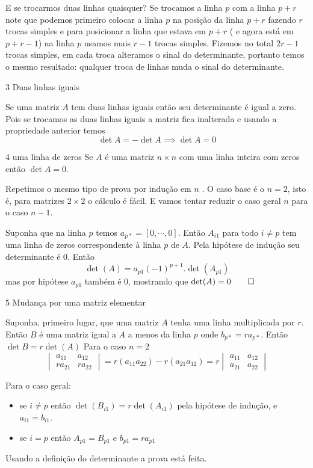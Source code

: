 \documentclass{beamer}
\begin{document}
\begin{frame}{E se trocarmos duas linhas quaisquer?}
  Se trocamos a linha $p$ com a linha $p+r$ note que podemos primeiro colocar
  a linha $p$ na posição da linha $p+r$ fazendo $r$
  trocas simples e para posicionar a linha que estava em 
  $p+r$ ( e agora está em $p+r-1$) na linha $p$ usamos 
  mais $r-1$ trocas simples. Fizemos no total $2r-1$ trocas 
  simples, em cada troca alteramos o sinal do determinante,
  portanto temos o mesmo resultado: qualquer troca de linhas muda o sinal do 
  determinante.
\end{frame}

\begin{frame}{3 Duas linhas iguais}

  Se uma matriz $A$ tem duas linhas iguais então seu 
  determinante é igual a zero.
  Pois se trocamos as duas linhas iguais a matriz fica
  inalterada e usando a propriedade anterior temos
  $$ \det{A}=-\det{A} \implies \det{A}=0 $$
\end{frame}

\begin{frame}{4 uma linha de zeros}
  Se $A$ é uma matriz $n\times n$ com uma linha inteira 
  com zeros entâo $\det{A} =0$.

  Repetimos o mesmo tipo de prova por indução em $n$ . O caso base é o $n=2$,
  isto é, para matrizes $2\times 2$ o cálculo é fácil. E vamos tentar reduzir o
  caso geral $n$ para o caso $n-1$.
  
  Suponha que na linha $p$ temos $a_{p*} = [0, \cdots, 0]$. Então $A_{i1}$ para todo $i\neq p$ tem uma linha
  de zeros correspondente à linha $p$ de $A$. Pela hipótese de indução seu determinante é $0$. Então 
  $$\det(A) = a_{p1}(-1)^{p+1}.\det(A_{p1})$$
  mas por hipótese $a_{p1}$ também é $0$, mostrando que $\det(A)=0 \qed$
\end{frame}

\begin{frame}{5 Mudança por uma matriz elementar}

  Suponha, primeiro lugar, que uma matriz $A$ tenha uma linha multiplicada por $r$. Então $B$ é uma matriz 
  igual a $A$ a menos da linha $p$ onde $b_{p*}=ra_{p*}$. Então $\det{B} =r\det(A)$
  Para o caso $n=2$
  $$ \begin{vmatrix}
    a_{11} & a_{12} \\
    ra_{21}& ra_{22}
  \end{vmatrix}= r(a_{11}a_{22}) - r(a_{21}a_{12}) =r \begin{vmatrix}
    a_{11} & a_{12} \\
    a_{21}& a_{22}
  \end{vmatrix} $$

  Para o caso geral:
  \begin{itemize}
    \item se $i\neq p$ então $\det(B_{i1}) =r\det(A_{i1})$ pela hipótese de indução, e $a_{i1}=b_{i1}$.
    \item se $i=p$ então $A_{p1} = B_{p1}$ e $b_{p1} = ra_{p1}$
  \end{itemize}

  Usando a definição do determinante a prova está feita.
  
\end{frame}
\end{document}
